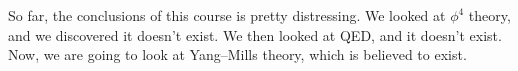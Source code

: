 \documentclass[a4paper]{article}
\begin{document}
So far, the conclusions of this course is pretty distressing. We looked at $\phi^4$ theory, and we discovered it doesn't exist. We then looked at QED, and it doesn't exist. Now, we are going to look at Yang--Mills theory, which is believed to exist.

%
%
\end{document}
